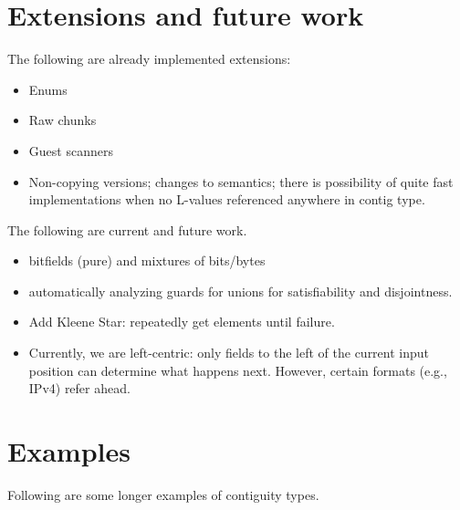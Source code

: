 \documentclass[svgnames]{llncs}
\newcommand{\eg}{e.g.}
\begin{document}
\section{Extensions and future work}

The following are already implemented extensions:

\begin{itemize}
\item Enums
\item Raw chunks
\item Guest scanners
\item Non-copying versions; changes to semantics; there is possibility
  of quite fast implementations when no L-values referenced anywhere
  in contig type.
\end{itemize}

\noindent The following are current and future work.

\begin{itemize}
\item bitfields (pure) and mixtures of bits/bytes
\item automatically analyzing guards for unions for satisfiability and disjointness.
\item Add Kleene Star: repeatedly get elements until failure.
\item Currently, we are left-centric: only fields to the left of the
  current input position can determine what happens next. However,
  certain formats (\eg, IPv4) refer ahead.

\end{itemize}


\appendix

\section{Examples}

Following are some longer examples of contiguity types.
\end{document}
